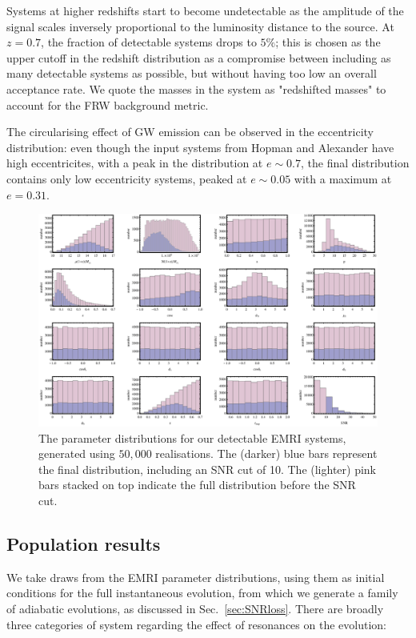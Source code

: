 \documentclass[aps,prd,amsfonts,amssymb,amsmath,nofootinbib,reprint,showpacs,superscriptaddress,twocolumn]{revtex4}
\newcommand{\secref}[1]{Sec.\ \ref{sec:#1}}
\begin{document}
Systems at higher redshifts start to become undetectable as the amplitude of the signal scales inversely proportional to the luminosity distance to the source. At $z=0.7$, the fraction of detectable systems drops to $5\%$; this is chosen as the upper cutoff in the redshift distribution as a compromise between including as many detectable systems as possible, but without having too low an overall acceptance rate. We quote the masses in the system as "redshifted masses" to account for the FRW background metric.

The circularising effect of GW emission can be observed in the eccentricity distribution: even though the input systems from Hopman and Alexander have high eccentricites, with a peak in the distribution at $e\sim0.7$, the final distribution contains only low eccentricity systems, peaked at $e\sim0.05$ with a maximum at $e=0.31$.

\begin{figure}[htbp]
\centering
\includegraphics[width=\textwidth]{Fig_EMRIpar_dists}
\caption{\label{fig:EMRIpar-dists}The parameter distributions for our detectable EMRI systems, generated using $50,000$ realisations. The (darker) blue bars represent the final distribution, including an SNR cut of 10. The (lighter) pink bars stacked on top indicate the full distribution before the SNR cut.}
\end{figure}

\subsection{Population results}
\label{sec:population}

We take draws from the EMRI parameter distributions, using them as initial conditions for the full instantaneous evolution, from which we generate a family of adiabatic evolutions, as discussed in \secref{SNRloss}. There are broadly three categories of system regarding the effect of resonances on the evolution:
\end{document}

